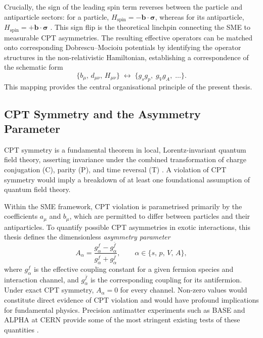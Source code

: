 \documentclass[12pt,a4paper]{report}
\begin{document}
Crucially, the sign of the leading spin term reverses between the particle and
antiparticle sectors: for a particle, $H_{\mathrm{spin}} = -\mathbf{b}\cdot
\boldsymbol{\sigma}$, whereas for its antiparticle,
$H_{\mathrm{spin}} = +\mathbf{b}\cdot\boldsymbol{\sigma}$ \cite{KosteleckyLane1999}.
This sign flip is the theoretical linchpin connecting the SME to measurable CPT
asymmetries. The resulting effective operators can be matched onto corresponding
Dobrescu--Mocioiu potentials by identifying the operator structures in the
non-relativistic Hamiltonian, establishing a correspondence of the schematic
form
\begin{equation}
  \{b_{\mu},\, d_{\mu\nu},\, H_{\mu\nu}\}
  \;\longleftrightarrow\;
  \{g_{s}g_{p},\; g_{V}g_{A},\;\ldots\}.
\end{equation}
This mapping provides the central organisational principle of the present
thesis.

\subsection{CPT Symmetry and the Asymmetry Parameter}

CPT symmetry is a fundamental theorem in local, Lorentz-invariant quantum field
theory, asserting invariance under the combined transformation of charge
conjugation (C), parity (P), and time reversal (T) \cite{Colladay1997}. A
violation of CPT symmetry would imply a breakdown of at least one foundational
assumption of quantum field theory.

Within the SME framework, CPT violation is parametrised primarily by the
coefficients $a_{\mu}$ and $b_{\mu}$, which are permitted to differ between
particles and their antiparticles. To quantify possible CPT asymmetries in
exotic interactions, this thesis defines the dimensionless \emph{asymmetry
parameter}
\begin{equation}
  A_{\alpha}
  = \frac{g_{\alpha}^{f} - g_{\alpha}^{\bar{f}}}
         {g_{\alpha}^{f} + g_{\alpha}^{\bar{f}}},
  \qquad \alpha\in\{s,\,p,\,V,\,A\},
\end{equation}
where $g_{\alpha}^{f}$ is the effective coupling constant for a given fermion
species and interaction channel, and $g_{\alpha}^{\bar{f}}$ is the
corresponding coupling for its antifermion. Under exact CPT symmetry, $A_{\alpha}
= 0$ for every channel. Non-zero values would constitute direct evidence of CPT
violation and would have profound implications for fundamental physics.
Precision antimatter experiments such as BASE and ALPHA at CERN provide some of
the most stringent existing tests of these quantities \cite{Smorra2017,Ahmadi2017}.
\end{document}
